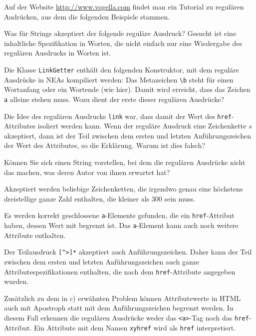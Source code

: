 Auf der Website \url{http://www.vogella.com} findet man ein Tutorial
zu regulären Audrücken, aus dem die folgenden Beispiele stammen.

\begin{teilaufgaben}
\item
Was für Strings akzeptiert der folgende reguläre Ausdruck?
Gesucht ist eine inhaltliche Spezifikation in Worten, die nicht einfach
nur eine Wiedergabe des regulären Ausdrucks in Worten ist.
\item
Die Klasse \texttt{LinkGetter} enthält den folgenden Konstruktor, mit
dem reguläre Ausdrücke in NEAs kompiliert werden:
Das Metazeichen \texttt{\textbackslash b} steht für einen Wortanfang
oder ein Wortende (wie hier).
Damit wird erreicht, dass das Zeichen \texttt{a} alleine stehen muss.
Wozu dient der erste dieser regulären Ausdrücke?
\item
Die Idee des regulären Ausdrucks \texttt{link} war, dass damit der Wert
des \texttt{href}-Attributes isoliert werden kann.
Wenn der reguläre Ausdruck eine Zeichenkette $s$ akzeptiert, dann ist der 
Teil zwischen dem ersten und letzten Anführungszeichen der Wert des
Attributes, so die Erklärung.
Warum ist dies falsch?
\item
Können Sie sich einen String vorstellen, bei dem die regulären Ausdrücke
nicht das machen, was deren Autor von ihnen erwartet hat?
\end{teilaufgaben}

\begin{loesung}
\begin{teilaufgaben}
\item
Akzeptiert werden beliebige Zeichenketten, die irgendwo genau eine höchstens
dreistellige ganze Zahl enthalten, die kleiner als 300 sein muss.
\item
Es werden korrekt geschlossene \texttt{a}-Elemente gefunden, die ein 
\texttt{href}-Attribut haben, dessen Wert mit \texttt{\textquotedbl}
begrenzt ist.
Das \texttt{a}-Element kann auch noch weitere Attribute enthalten.
\item
Der Teilausdruck
\texttt{[\textasciicircum>]*}
akzeptiert auch Anführungszeichen.
Daher kann der Teil zwischen dem ersten und letzten Anführungszeichen
auch ganze Attributespezifikationen enthalten, die nach dem
\texttt{href}-Attribute angegeben wurden.
\item
Zusätzlich zu dem in c) erwähnten Problem können
Attributewerte in HTML auch mit Apostroph \texttt{\textquotesingle}
statt mit dem Anführungszeichen \texttt{\textquotedbl} begrenzt werden.
In diesem Fall erkennen die regulären Ausdrücke weder das \texttt{<a>}-Tag
noch das \texttt{href}-Attribut.
Ein Attribute mit dem Namen \texttt{xyhref} wird als \texttt{href}
interpretiert.
\qedhere
\end{teilaufgaben}
\end{loesung}


